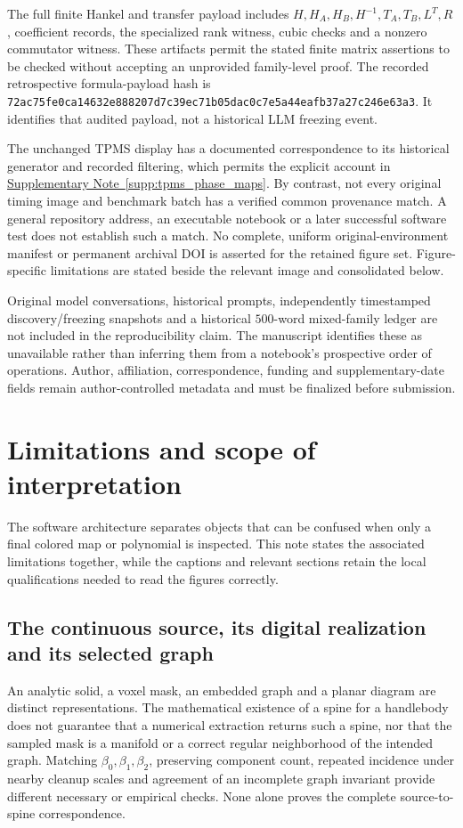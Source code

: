 \documentclass[10pt,twocolumn]{article}
\providecommand{\SuppSubsecref}[1]{\hyperref[#1]{Supplementary Note~\ref*{#1}}}
\begin{document}
The full finite Hankel and transfer payload includes $H,H_A,H_B,H^{-1},T_A,T_B,L^T,R$, coefficient records, the specialized rank witness, cubic checks and a nonzero commutator witness. These artifacts permit the stated finite matrix assertions to be checked without accepting an unprovided family-level proof. The recorded retrospective formula-payload hash is \texttt{72ac75fe0ca14632e888207d7c39ec71b05dac0c7e5a44eafb37a27c246e63a3}. It identifies that audited payload, not a historical LLM freezing event.

The unchanged TPMS display has a documented correspondence to its historical generator and recorded filtering, which permits the explicit account in \SuppSubsecref{supp:tpms_phase_maps}. By contrast, not every original timing image and benchmark batch has a verified common provenance match. A general repository address, an executable notebook or a later successful software test does not establish such a match. No complete, uniform original-environment manifest or permanent archival DOI is asserted for the retained figure set. Figure-specific limitations are stated beside the relevant image and consolidated below.

Original model conversations, historical prompts, independently timestamped discovery/freezing snapshots and a historical $500$-word mixed-family ledger are not included in the reproducibility claim. The manuscript identifies these as unavailable rather than inferring them from a notebook's prospective order of operations. Author, affiliation, correspondence, funding and supplementary-date fields remain author-controlled metadata and must be finalized before submission.

\FloatBarrier
\section{Limitations and scope of interpretation}
\label{supp:limitations}
The software architecture separates objects that can be confused when only a final colored map or polynomial is inspected. This note states the associated limitations together, while the captions and relevant sections retain the local qualifications needed to read the figures correctly.

\subsection{The continuous source, its digital realization and its selected graph}
\label{supp:limitations_correspondence}
An analytic solid, a voxel mask, an embedded graph and a planar diagram are distinct representations. The mathematical existence of a spine for a handlebody does not guarantee that a numerical extraction returns such a spine, nor that the sampled mask is a manifold or a correct regular neighborhood of the intended graph. Matching $\beta_0,\beta_1,\beta_2$, preserving component count, repeated incidence under nearby cleanup scales and agreement of an incomplete graph invariant provide different necessary or empirical checks. None alone proves the complete source-to-spine correspondence.
\end{document}
